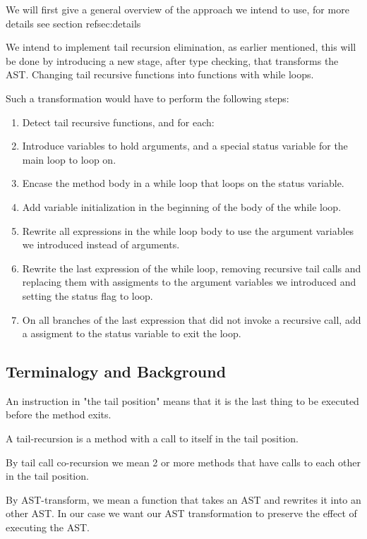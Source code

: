 We will first give a general overview of the approach we intend to use, for more details see section ref{sec:details}

We intend to implement tail recursion elimination, as earlier mentioned, this will be done by introducing a new stage, after type checking, that transforms the AST. Changing tail recursive functions into functions with while loops.

Such a transformation would have to perform the following steps:

\begin{enumerate}
    \item Detect tail recursive functions, and for each:
    \item Introduce variables to hold arguments, and a special status variable for the main loop to loop on.
    \item Encase the method body in a while loop that loops on the status variable.
    \item Add variable initialization in the beginning of the body of the while loop.
    \item Rewrite all expressions in the while loop body to use the argument variables we introduced instead of arguments. 
    \item Rewrite the last expression of the while loop, removing recursive tail calls and replacing them with assigments to the argument variables we introduced and setting the status flag to loop.
    \item On all branches of the last expression that did not invoke a recursive call, add a assigment to the status variable to exit the loop.
\end{enumerate}




\subsection{Terminalogy and Background}
An instruction in "the tail position" means that it is the last thing to be executed before the method exits.

A tail-recursion is a method with a call to itself in the tail position.

By tail call co-recursion we mean 2 or more methods that have calls to each other in the tail position.

By AST-transform, we mean a function that takes an AST and rewrites it into an other AST. In our case we want our AST transformation to preserve the effect of executing the AST.

